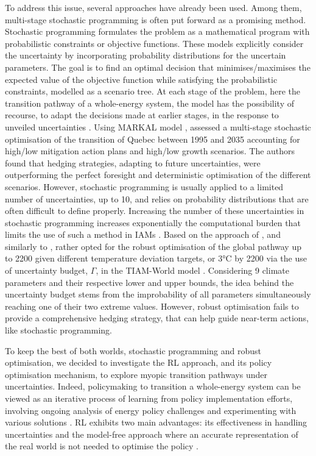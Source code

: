 To address this issue, several approaches have already been used. Among them,  multi-stage stochastic programming is often put forward as a promising method. Stochastic programming formulates the problem as a mathematical program with probabilistic constraints or objective functions. These models explicitly consider the uncertainty by incorporating probability distributions for the uncertain parameters. The goal is to find an optimal decision that minimises/maximises the expected value of the objective function while satisfying the probabilistic constraints, modelled as a scenario tree.  At each stage of the problem, here the transition pathway of a whole-energy system, the model has the possibility of recourse, \ie to adapt the decisions made at earlier stages, in the response to unveiled uncertainties \cite{grossmann2016recent}. Using MARKAL model \cite{fishbone1981markal}, \citet{kanudia1998robust} assessed a multi-stage stochastic optimisation of the transition of Quebec between 1995 and 2035 accounting for high/low mitigation action plans and high/low growth scenarios. The authors found that hedging strategies, adapting to future uncertainties, were outperforming the perfect foresight and deterministic optimisation of the different scenarios. However, stochastic programming is usually applied to a limited number of uncertainties, \ie up to 10, and relies on probability distributions that are often difficult to define properly. Increasing the number of these uncertainties in stochastic programming increases exponentially the computational burden that limits the use of such a method in \gls{IAMs} \cite{nicolas2021robust}. Based on the approach of \citet{bertsimas2004price}, and similarly to \citet{Moret2017PhDThesis}, \citet{nicolas2021robust} rather opted for the robust optimisation of the global pathway up to 2200 given different temperature deviation targets,  or 3°C by 2200 via the use of uncertainty budget, $\Gamma$, in the TIAM-World model \cite{loulou2005documentation}. Considering 9 climate parameters and their respective lower and upper bounds, the idea behind the uncertainty budget stems from the improbability of all parameters simultaneously reaching one of their two extreme values.  However, robust optimisation fails to provide a comprehensive hedging strategy, that can help guide near-term actions, like stochastic programming.

To keep the best of both worlds, \ie stochastic programming and robust optimisation, we decided to investigate the \gls{RL} approach, and its policy optimisation mechanism, to explore myopic transition pathways under uncertainties. Indeed, policymaking to transition a whole-energy system can be viewed as an iterative process of learning from policy implementation efforts, involving ongoing analysis of energy policy challenges and experimenting with various solutions \cite{howlett1995studying}. \gls{RL} exhibits two main advantages: its effectiveness in handling uncertainties and the model-free approach where an accurate representation of the real world is not needed to optimise the policy \cite{perera2021applications}. 


